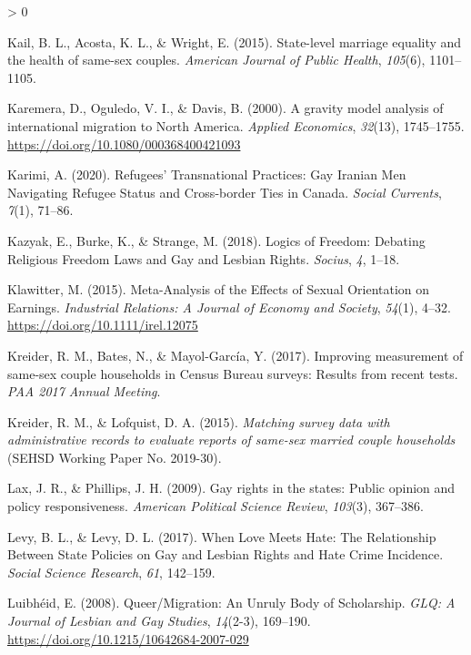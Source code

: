 \documentclass[
  11pt,
]{article}
\newlength{\cslhangindent}
\newenvironment{CSLReferences}[2] %
 {%
  \setlength{\parindent}{0pt}
  \ifodd #1 \everypar{\setlength{\hangindent}{\cslhangindent}}\ignorespaces\fi
  \ifnum #2 > 0
  \setlength{\parskip}{#2\baselineskip}
  \fi
 }%
 {}
\begin{document}
\begin{CSLReferences}{1}{0}
\leavevmode\hypertarget{ref-kail_2015}{}%
Kail, B. L., Acosta, K. L., \& Wright, E. (2015). State-level marriage equality and the health of same-sex couples. \emph{American Journal of Public Health}, \emph{105}(6), 1101--1105.

\leavevmode\hypertarget{ref-karemera_2000}{}%
Karemera, D., Oguledo, V. I., \& Davis, B. (2000). A gravity model analysis of international migration to {North America}. \emph{Applied Economics}, \emph{32}(13), 1745--1755. \url{https://doi.org/10.1080/000368400421093}

\leavevmode\hypertarget{ref-karimi_2020}{}%
Karimi, A. (2020). Refugees' {Transnational Practices}: {Gay Iranian Men Navigating Refugee Status} and {Cross}-border {Ties} in {Canada}. \emph{Social Currents}, \emph{7}(1), 71--86.

\leavevmode\hypertarget{ref-kazyak_2018}{}%
Kazyak, E., Burke, K., \& Strange, M. (2018). Logics of {Freedom}: {Debating Religious Freedom Laws} and {Gay} and {Lesbian Rights}. \emph{Socius}, \emph{4}, 1--18.

\leavevmode\hypertarget{ref-klawitter_2015}{}%
Klawitter, M. (2015). Meta-{Analysis} of the {Effects} of {Sexual Orientation} on {Earnings}. \emph{Industrial Relations: A Journal of Economy and Society}, \emph{54}(1), 4--32. \url{https://doi.org/10.1111/irel.12075}

\leavevmode\hypertarget{ref-kreider_2017}{}%
Kreider, R. M., Bates, N., \& Mayol-García, Y. (2017). Improving measurement of same-sex couple households in {Census Bureau} surveys: {Results} from recent tests. \emph{{PAA} 2017 Annual Meeting}.

\leavevmode\hypertarget{ref-kreider_2015}{}%
Kreider, R. M., \& Lofquist, D. A. (2015). \emph{Matching survey data with administrative records to evaluate reports of same-sex married couple households} (SEHSD Working Paper No. 2019-30).

\leavevmode\hypertarget{ref-lax_2009}{}%
Lax, J. R., \& Phillips, J. H. (2009). Gay rights in the states: {Public} opinion and policy responsiveness. \emph{American Political Science Review}, \emph{103}(3), 367--386.

\leavevmode\hypertarget{ref-levy_2017}{}%
Levy, B. L., \& Levy, D. L. (2017). When {Love Meets Hate}: {The Relationship Between State Policies} on {Gay} and {Lesbian Rights} and {Hate Crime Incidence}. \emph{Social Science Research}, \emph{61}, 142--159.

\leavevmode\hypertarget{ref-luibheid_2008}{}%
Luibhéid, E. (2008). Queer/{Migration}: {An Unruly Body} of {Scholarship}. \emph{GLQ: A Journal of Lesbian and Gay Studies}, \emph{14}(2-3), 169--190. \url{https://doi.org/10.1215/10642684-2007-029}


\end{CSLReferences}
\end{document}
